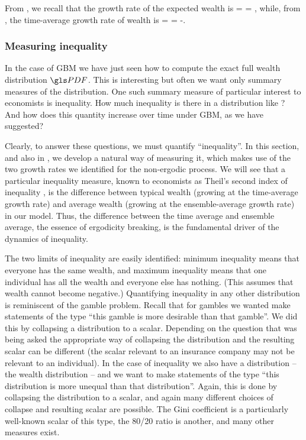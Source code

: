 From , we recall that the growth rate of the expected wealth is
\be
\gex =  = \mu,
\ee
while, from , the time-average growth rate of wealth is
\be
\gt =  = \mu-.
\ee


\subsubsection{Measuring inequality}
In the case of GBM we have just seen how to 
compute the exact full wealth distribution $\PDF$. This is interesting but often we want only summary measures of the distribution. One such summary measure of particular interest to economists is inequality. How much inequality is there in a distribution like ? And how does this quantity increase over time under GBM, as we have suggested?

Clearly, to answer these questions, we must quantify ``inequality''. In this section, and also in \cite{AdamouPeters2016}, we develop a natural way of measuring it, which makes use of the two growth rates we identified for the non-ergodic process. We will see that a particular inequality measure, known to economists as Theil's second index of inequality \cite{Theil1967}, is the difference between typical wealth (growing at the time-average growth rate) and average wealth (growing at the ensemble-average growth rate) in our model. Thus, the difference between the time average and ensemble average, the essence of ergodicity breaking, is the fundamental driver of the dynamics of inequality.

The two limits of inequality are easily identified: minimum inequality means that everyone 
has the same wealth, and maximum inequality means that one individual has all the 
wealth and everyone else has nothing. (This assumes that wealth cannot become 
negative.) Quantifying inequality in any other distribution is reminiscent of the gamble 
problem. Recall that for gambles we wanted make statements of the type ``this gamble 
is more desirable than that gamble''. We did this by collapsing a distribution to a 
scalar. Depending on the question that was being asked 
the appropriate way of collapsing the distribution and the resulting scalar can be different 
(the scalar relevant to an insurance company may not be relevant to an individual). 
In the case of inequality we also have a distribution -- the wealth distribution -- and we 
want to make statements of the type ``this distribution is more unequal than that 
distribution''. Again, this is done by collapsing the distribution to a scalar, and again 
many different choices of collapse and resulting scalar are possible. The Gini 
coefficient is a particularly well-known scalar of this type, the 80/20 ratio is another, 
and many other measures exist.

